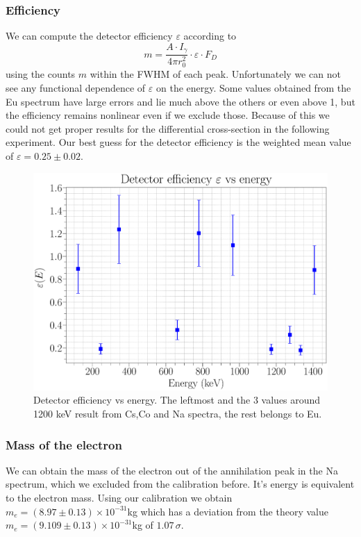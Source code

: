 \documentclass[a4paper,12pt]{article}
\begin{document}
\subsubsection{Efficiency}

We can compute the detector efficiency $\varepsilon$ according to 
\begin{equation}
	m = \frac{A \cdot I_\gamma}{4 \pi r_0^2} \cdot \varepsilon \cdot F_D
\end{equation}
using the counts $m$ within the FWHM of each peak. Unfortunately we can not see any functional dependence of $\varepsilon$ on the energy. Some values obtained from the Eu spectrum have large errors and lie much above the others or even above 1, but the efficiency remains nonlinear even if we exclude those. Because of this we could not get proper results for the differential cross-section in the following experiment. Our best guess for the detector efficiency is the weighted mean value of $\varepsilon = 0.25 \pm 0.02$.


\begin{figure}[H]
	\centering
	\includegraphics[scale=0.3]{../Figures/Efficiency.eps}
	\caption{Detector efficiency vs energy. The leftmost and the 3 values around 1200 keV result from Cs,Co and Na spectra, the rest belongs to Eu.}
	\label{efficiency}
\end{figure}

\subsubsection{Mass of the electron}
We can obtain the mass of the electron out of the annihilation peak in the Na spectrum, which we excluded from the calibration before. It's energy is equivalent to the electron mass. 
Using our calibration we obtain $m_e = (8.97 \pm 0.13) \times 10^{-31}$kg which has a deviation from the theory value $m_e = (9.109 \pm 0.13) \times 10^{-31}$kg of $1.07 \, \sigma$.
\end{document}

